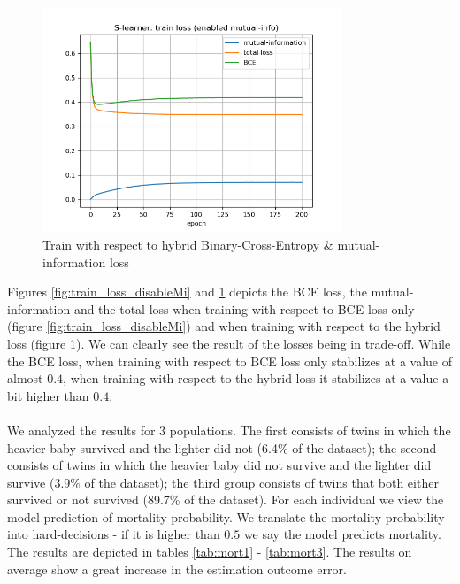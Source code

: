 \documentclass[oneside,12pt]{article}
\begin{document}
\begin{figure}
    \centering
        \includegraphics[width=0.8\textwidth]{./train_loss_enableMi}
        \caption{\label{fig:train_loss_enableMi}Train with respect to hybrid Binary-Cross-Entropy & mutual-information loss}
\end{figure}
%
Figures \ref{fig:train_loss_disableMi} and \ref{fig:train_loss_enableMi} depicts the BCE loss, the mutual-information and the total loss when training with respect to BCE loss only (figure \ref{fig:train_loss_disableMi}) and when training with respect to the hybrid loss (figure \ref{fig:train_loss_enableMi}). We can clearly see the result of the losses being in trade-off. While the BCE loss, when training with respect to BCE loss only stabilizes at a value of almost $0.4$, when training with respect to the hybrid loss it stabilizes at a value a-bit higher than $0.4$.\\\\
%
We analyzed the results for 3 populations. The first consists of twins in which the heavier baby survived and the lighter did not (6.4\% of the dataset); the second consists of twins in which the heavier baby did not survive and the lighter did survive (3.9\% of the dataset); the third group consists of twins that both either survived or not survived (89.7\% of the dataset). For each individual we view the model prediction of mortality probability. We translate the mortality probability into hard-decisions - if it is higher than $0.5$ we say the model predicts mortality. The results are depicted in tables \ref{tab:mort1} - \ref{tab:mort3}. The results on average show a great increase in the estimation outcome error.
%
\end{document}
